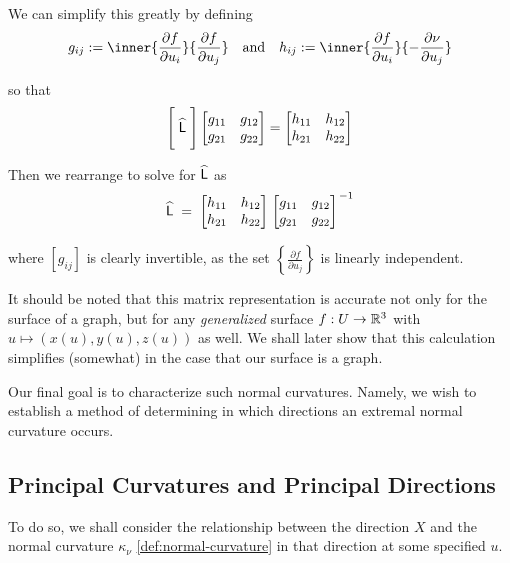 	We can simplify this greatly by defining 
	\begin{equation}\label{fundamentalformcoefficients}
	g_{ij} := \inner{\frac{\partial f}{\partial u_i}}{\frac{\partial f}{\partial u_j}}
	\quad \textrm{and}\quad
	h_{ij} := \inner{\frac{\partial f}{\partial u_i}}{-\frac{\partial \nu}{\partial u_j}}
	\end{equation}
	
	so that
	\begin{equation}
	\Bigg[ \;\widehat{\mathsf{L}}\; \Bigg]
	\begin{bmatrix} g_{11} & g_{12} \\ g_{21} & g_{22} \end{bmatrix}
	= \begin{bmatrix} h_{11} & h_{12} \\ h_{21} & h_{22} \end{bmatrix}
	\end{equation}
	
	Then we rearrange to solve for $\widehat{\mathsf{L}}$ as
		\begin{equation} \label{weinmatconstruction}
		\widehat{\mathsf{L}}
		\;=\; \begin{bmatrix} h_{11} & h_{12} \\ h_{21} & h_{22} \end{bmatrix}
		\left.\begin{bmatrix} g_{11} & g_{12} \\ g_{21} & g_{22} \end{bmatrix}\right.^{-1}
		\end{equation}
	
	where $\left[ g_{ij} \right]$ is clearly invertible, as the set
	$\left\{\frac{\partial f}{\partial u_j}\right\}$ is linearly independent.
	
	It should be noted that this matrix representation is accurate not only for the surface of a graph, but for any \textit{generalized} surface
	$f: U \to \mathbb{R}^3 $ with $u \mapsto (x(u), y(u), z(u))$ as well. We shall later show that this calculation simplifies (somewhat) in the case that our surface is a graph.
	
	Our final goal is to characterize such normal curvatures.
	Namely, we wish to establish a method of determining in which directions an extremal normal curvature occurs.
	
	
	\subsection{Principal Curvatures and Principal Directions}
	To do so, we shall consider the relationship between the direction $X$ and the normal curvature $\kappa_\nu$ \cref{def:normal-curvature} in that direction at some specified $u$.


